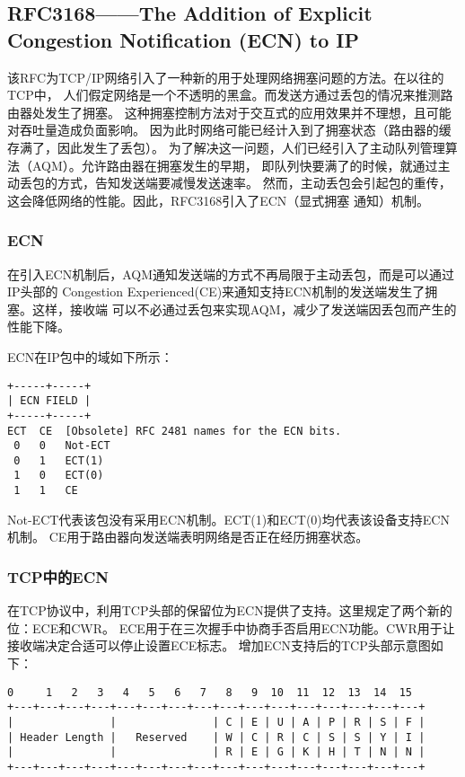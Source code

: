 \subsection{RFC3168——The Addition of Explicit Congestion Notification (ECN) to IP}
\label{subsec:rfc3168}
该RFC为TCP/IP网络引入了一种新的用于处理网络拥塞问题的方法。在以往的TCP中，
人们假定网络是一个不透明的黑盒。而发送方通过丢包的情况来推测路由器处发生了拥塞。
这种拥塞控制方法对于交互式的应用效果并不理想，且可能对吞吐量造成负面影响。
因为此时网络可能已经计入到了拥塞状态（路由器的缓存满了，因此发生了丢包）。
为了解决这一问题，人们已经引入了主动队列管理算法（AQM）。允许路由器在拥塞发生的早期，
即队列快要满了的时候，就通过主动丢包的方式，告知发送端要减慢发送速率。
然而，主动丢包会引起包的重传，这会降低网络的性能。因此，RFC3168引入了ECN（显式拥塞
通知）机制。

\subsubsection{ECN}
\label{subsubsec:ecn}
在引入ECN机制后，AQM通知发送端的方式不再局限于主动丢包，而是可以通过IP头部的
Congestion Experienced(CE)来通知支持ECN机制的发送端发生了拥塞。这样，接收端
可以不必通过丢包来实现AQM，减少了发送端因丢包而产生的性能下降。

ECN在IP包中的域如下所示：
\begin{verbatim}
+-----+-----+ 
| ECN FIELD | 
+-----+-----+ 
ECT  CE  [Obsolete] RFC 2481 names for the ECN bits. 
 0   0   Not-ECT 
 0   1   ECT(1) 
 1   0   ECT(0) 
 1   1   CE
\end{verbatim}

Not-ECT代表该包没有采用ECN机制。ECT(1)和ECT(0)均代表该设备支持ECN机制。
CE用于路由器向发送端表明网络是否正在经历拥塞状态。

\subsubsection{TCP中的ECN}
在TCP协议中，利用TCP头部的保留位为ECN提供了支持。这里规定了两个新的位：ECE和CWR。
ECE用于在三次握手中协商手否启用ECN功能。CWR用于让接收端决定合适可以停止设置ECE标志。
增加ECN支持后的TCP头部示意图如下：
\begin{verbatim}
0     1   2   3   4   5   6   7   8   9  10  11  12  13  14  15 
+---+---+---+---+---+---+---+---+---+---+---+---+---+---+---+---+ 
|               |               | C | E | U | A | P | R | S | F | 
| Header Length |   Reserved    | W | C | R | C | S | S | Y | I | 
|               |               | R | E | G | K | H | T | N | N | 
+---+---+---+---+---+---+---+---+---+---+---+---+---+---+---+---+
\end{verbatim}

